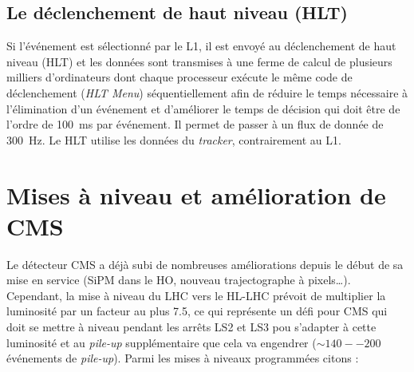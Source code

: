 \subsection{Le déclenchement de haut niveau (HLT)}
Si l'événement est sélectionné par le L1, il est envoyé au déclenchement de haut niveau (HLT) et les données sont transmises à une ferme de calcul de plusieurs milliers d'ordinateurs  dont chaque processeur exécute le même code de déclenchement (\textit{HLT Menu}) séquentiellement afin de réduire le temps nécessaire à l'élimination d'un événement et d'améliorer le temps de décision qui doit être de l'ordre de \SI{100}{\milli\second} par événement. Il permet de passer à un flux de donnée de \SI{300}{\hertz}. Le HLT utilise les données du \textit{tracker}, contrairement au L1.

\section{Mises à niveau et amélioration de CMS}
Le détecteur CMS a déjà subi de nombreuses améliorations depuis le début de sa mise en service (SiPM dans le HO, nouveau trajectographe à pixels\ldots). Cependant, la mise à niveau du LHC vers le HL-LHC prévoit de multiplier la luminosité par un facteur au plus \num{7.5}, ce qui représente un défi pour CMS qui doit se mettre à niveau pendant les arrêts LS2 et LS3 pou s'adapter à cette luminosité et au \textit{pile-up} supplémentaire que cela va engendrer ($\sim\num{140}--\num{200}$ événements de \textit{pile-up}). Parmi les mises à niveaux programmées citons \cite{Collaboration:1355706} \cite{Contardo:2020886} :
